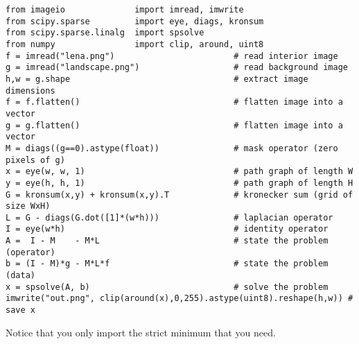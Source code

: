 \begin{verbatim}
from imageio              import imread, imwrite
from scipy.sparse         import eye, diags, kronsum
from scipy.sparse.linalg  import spsolve
from numpy                import clip, around, uint8
f = imread("lena.png")                        # read interior image
g = imread("landscape.png")                   # read background image
h,w = g.shape                                 # extract image dimensions
f = f.flatten()                               # flatten image into a vector
g = g.flatten()                               # flatten image into a vector
M = diags((g==0).astype(float))               # mask operator (zero pixels of g)
x = eye(w, w, 1)                              # path graph of length W
y = eye(h, h, 1)                              # path graph of length H
G = kronsum(x,y) + kronsum(x,y).T             # kronecker sum (grid of size WxH)
L = G - diags(G.dot([1]*(w*h)))               # laplacian operator
I = eye(w*h)                                  # identity operator
A =  I - M    - M*L                           # state the problem (operator)
b = (I - M)*g - M*L*f                         # state the problem (data)
x = spsolve(A, b)                             # solve the problem
imwrite("out.png", clip(around(x),0,255).astype(uint8).reshape(h,w)) # save x
\end{verbatim}

Notice that you only import the strict minimum that you need.



